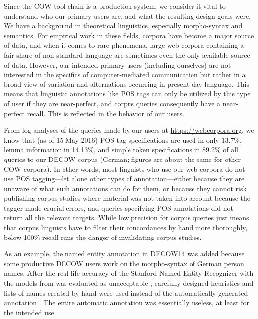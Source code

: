 \documentclass[11pt]{article}
\begin{document}
Since the COW tool chain is a production system, we consider it vital to understand who our primary users are, and what the resulting design goals were.
We have a background in theoretical linguistics, especially morpho-syntax and semantics.
For empirical work in these fields, corpora have become a major source of data, and when it comes to rare phenomena, large web corpora containing a fair share of non-standard language are sometimes even the only available source of data.
However, our intended primary users (including ourselves) are not interested in the specifics of computer-mediated communication but rather in a broad view of variation and alternations occurring in present-day language.
This means that linguistic annotations like POS tags can only be utilized by this type of user if they are near-perfect, and corpus queries consequently have a near-perfect recall.
This is reflected in the behavior of our users.

From log analyses of the queries made by our users at \url{https://webcorpora.org}, we know that (as of 15 May 2016) POS tag specifications are used in only 13.7\%, lemma information in 14.13\%, and simple token specifications in 89.2\% of all queries to our DECOW-corpus (German; figures are about the same for other COW corpora).
In other words, most linguists who use our web corpora do not use POS tagging---let alone other types of annotation---either because they are unaware of what such annotations can do for them, or because they cannot risk publishing corpus studies where material was not taken into account because the tagger made crucial errors, and queries specifying POS annotations did not return all the relevant targets.
While low precision for corpus queries just means that corpus linguists have to filter their concordances by hand more thoroughly, below 100\% recall runs the danger of invalidating corpus studies.

As an example, the named entity annotation in DECOW14 was added because some productive DECOW users work on the morpho-syntax of German person names.
After the real-life accuracy of the Stanford Named Entity Recognizer with the models from  was evaluated as unacceptable \cite{Helmers2013}, carefully designed heuristics and lists of names created by hand were used instead of the automatically generated annotation \cite{Ackermann2016}.
The entire automatic annotation was essentially useless, at least for the intended use.
\end{document}
